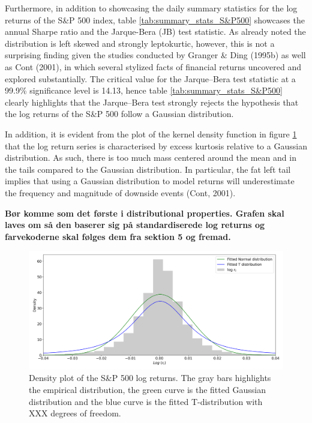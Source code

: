 Furthermore, in addition to showcasing the daily summary statistics for the log returns of the S\&P 500 index, table \ref{tab:summary_stats_S&P500} showcases the annual Sharpe ratio and the Jarque-Bera (JB) test statistic. As already noted the distribution is left skewed and strongly leptokurtic, however, this is not a surprising finding given the studies conducted by Granger \& Ding (1995b) as well as Cont (2001), in which several stylized facts of financial returns uncovered and explored substantially. The critical value for the Jarque–Bera test statistic at a 99.9\% significance level is 14.13, hence table \ref{tab:summary_stats_S&P500} clearly highlights that the Jarque–Bera test strongly rejects the hypothesis that the log returns of the S\&P 500 follow a Gaussian distribution.  

In addition, it is evident from the plot of the kernel density function in figure \ref{fig: Kernel_distributions} that the log return series is characterised by excess kurtosis relative to a Gaussian distribution. As such, there is too much mass centered around the mean and in the tails compared to the Gaussian distribution. In particular, the fat left tail implies that using a Gaussian distribution to model returns will underestimate the frequency and magnitude of downside events (Cont, 2001). 

\textbf{Bør komme som det første i distributional properties. Grafen skal laves om så den baserer sig på standardiserede log returns og farvekoderne skal følges dem fra sektion 5 og fremad.}
\begin{figure}[H] 
    \centering
    \includegraphics[width=1\textwidth]{analysis/data_description/images/SP500_distribution.png}
    \caption[Density plot of the S\&P 500 log returns] {Density plot of the S\&P 500 log returns. The gray bars highlights the empirical distribution, the green curve is the fitted Gaussian distribution and the blue curve is the fitted T-distribution with XXX degrees of freedom.}
    \label{fig: Kernel_distributions}
\end{figure}


